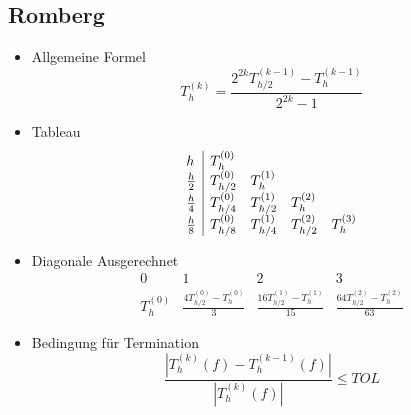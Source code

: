 \subsection{Romberg}
\begin{itemize}
	
	\item Allgemeine Formel \\
	\begin{displaymath}
		T_h^{(k)} = \frac{2^{2k} T_{h/2}^{(k-1)} - T_h^{(k-1)}}{2^{2k}-1}
	\end{displaymath}
	
	\item Tableau \\
	\begin{displaymath}
		\begin{array}{l | llll}
			h & T_h^{(0)} \\
			\frac{h}{2} & T_{h/2}^{(0)} & T_{h}^{(1)} \\
			\frac{h}{4} & T_{h/4}^{(0)} & T_{h/2}^{(1)} & T_{h}^{(2)} \\
			\frac{h}{8} & T_{h/8}^{(0)} & T_{h/4}^{(1)} & T_{h/2}^{(2)} & T_{h}^{(3)} \\
		\end{array}
	\end{displaymath}
	
	\item Diagonale Ausgerechnet \\
	\begin{displaymath}
		\begin{array}{cccc}
			0 & 1 & 2 & 3 \\
			\hline
			T_h^{(0)} & 
			\frac{4T_{h/2}^{(0)} - T_h^{(0)}}{3} &
			\frac{16T_{h/2}^{(1)} - T_h^{(1)}}{15} &
			\frac{64T_{h/2}^{(2)} - T_h^{(2)}}{63}
		\end{array}
	\end{displaymath}
	
	\item Bedingung für Termination \\
	\begin{equation*}
		\frac{|T_{h}^{(k)}(f) - T_{h}^{(k-1)}(f)|}{|T_{h}^{(k)}(f)|} \leq TOL
	\end{equation*}
		
\end{itemize}

